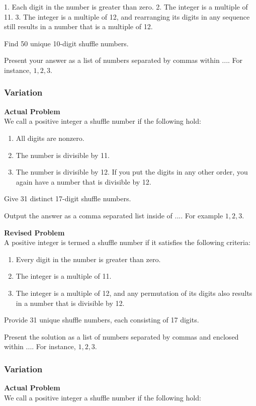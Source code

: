 1. Each digit in the number is greater than zero.
2. The integer is a multiple of 11.
3. The integer is a multiple of 12, and rearranging its digits in any sequence still results in a number that is a multiple of 12.

Find 50 unique 10-digit shuffle numbers.

Present your answer as a list of numbers separated by commas within $\boxed{...}$. For instance, $\boxed{1, 2, 3}$.

\subsubsection{Variation}
\textbf{Actual Problem}\\
We call a positive integer a shuffle number if the following hold:

\begin{enumerate}
\item All digits are nonzero.
\item The number is divisible by 11.
\item The number is divisible by 12. If you put the digits in any other order, you again have a number that is divisible by 12.
\end{enumerate}
Give 31 distinct 17-digit shuffle numbers.

Output the answer as a comma separated list inside of $\boxed{...}$. For example $\boxed{1, 2, 3}$.

\textbf{Revised Problem}\\
A positive integer is termed a shuffle number if it satisfies the following criteria:

\begin{enumerate}
\item Every digit in the number is greater than zero.
\item The integer is a multiple of 11.
\item The integer is a multiple of 12, and any permutation of its digits also results in a number that is divisible by 12.
\end{enumerate}
Provide 31 unique shuffle numbers, each consisting of 17 digits.

Present the solution as a list of numbers separated by commas and enclosed within $\boxed{...}$. For instance, $\boxed{1, 2, 3}$.

\subsubsection{Variation}
\textbf{Actual Problem}\\
We call a positive integer a shuffle number if the following hold:

